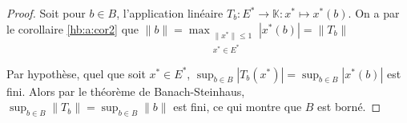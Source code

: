 \begin{proof}
  Soit pour $b\in B$, l'application linéaire $T_b: E^*\to\mathbb{K}:
  x^*\mapsto x^*(b)$. On a par le corollaire \ref{hb:a:cor2} que
  $\displaystyle{\|b\| =
    \max_{\substack{\|x^*\|\leq 1 \\ x^*\in E^*}}|x^*(b)| =\|T_b\|}$

  Par hypothèse, quel que soit $x^*\in E^*$,
  $\sup_{b\in B}|T_b(x^*)| = \sup_{b\in B}|x^*(b)|$
  est fini. Alors par le théorème de Banach-Steinhaus,
  $\sup_{b\in B}\|T_b\| = \sup_{b\in B}\|b\|$ est fini, ce qui
  montre que $B$ est borné.
\end{proof}

